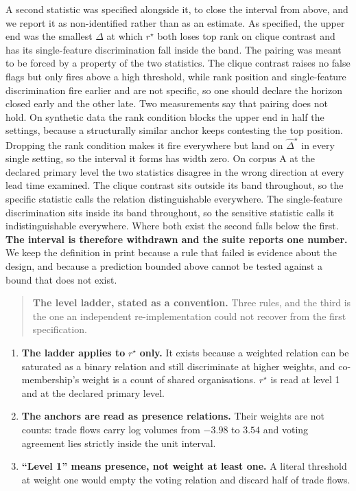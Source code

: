 \documentclass[twoside,11pt]{article}
\providecommand{\tightlist}{%
  \setlength{\itemsep}{0pt}\setlength{\parskip}{0pt}}
\begin{document}
A second statistic was specified alongside it, to close the interval from above, and we report it as non-identified rather than as an estimate. As specified, the upper end was the smallest \(\Delta\) at which \(r^{\star}\) both loses top rank on clique contrast and has its single-feature discrimination fall inside the band. The pairing was meant to be forced by a property of the two statistics. The clique contrast raises no false flags but only fires above a high threshold, while rank position and single-feature discrimination fire earlier and are not specific, so one should declare the horizon closed early and the other late. Two measurements say that pairing does not hold. On synthetic data the rank condition blocks the upper end in half the settings, because a structurally similar anchor keeps contesting the top position. Dropping the rank condition makes it fire everywhere but land on \({\widehat{\Delta}}^{\star}\) in every single setting, so the interval it forms has width zero. On corpus A at the declared primary level the two statistics disagree in the wrong direction at every lead time examined. The clique contrast sits outside its band throughout, so the specific statistic calls the relation distinguishable everywhere. The single-feature discrimination sits inside its band throughout, so the sensitive statistic calls it indistinguishable everywhere. Where both exist the second falls below the first. \textbf{The interval is therefore withdrawn and the suite reports one number.} We keep the definition in print because a rule that failed is evidence about the design, and because a prediction bounded above cannot be tested against a bound that does not exist.

\begin{quote}
\textbf{The level ladder, stated as a convention.} Three rules, and the third is the one an independent re-implementation could not recover from the first specification.
\end{quote}

\begin{enumerate}
\def\labelenumi{\arabic{enumi}.}
\tightlist
\item
  \textbf{The ladder applies to} \(r^{\star}\) \textbf{only.} It exists because a weighted relation can be saturated as a binary relation and still discriminate at higher weights, and co-membership's weight is a count of shared organisations. \(r^{\star}\) is read at level 1 and at the declared primary level.
\item
  \textbf{The anchors are read as presence relations.} Their weights are not counts: trade flows carry log volumes from \(- 3.98\) to \(3.54\) and voting agreement lies strictly inside the unit interval.
\item
  \textbf{``Level 1'' means presence, not weight at least one.} A literal threshold at weight one would empty the voting relation and discard half of trade flows.
\end{enumerate}
\end{document}
